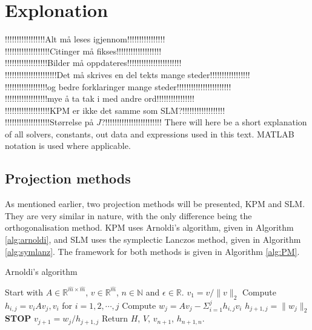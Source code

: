 \chapter{Explonation}
!!!!!!!!!!!!!!!!!Alt må leses igjennom!!!!!!!!!!!!!!!!\\
!!!!!!!!!!!!!!!!!!!Citinger må fikses!!!!!!!!!!!!!!!!!!!\\
!!!!!!!!!!!!!!!!!!Bilder må oppdateres!!!!!!!!!!!!!!!!!!!!!!!\\
!!!!!!!!!!!!!!!!!!!!!!Det må skrives en del tekts mange steder!!!!!!!!!!!!!!!!!\\
!!!!!!!!!!!!!!!!!!og bedre forklaringer mange steder!!!!!!!!!!!!!!!!!!!!!!!\\
!!!!!!!!!!!!!!!!!!mye å ta tak i med andre ord!!!!!!!!!!!!!!!!\\
!!!!!!!!!!!!!!!!!!!KPM er ikke det samme som SLM?!!!!!!!!!!!!!!!!!!\\
!!!!!!!!!!!!!!!!!!!Størrelse på $J$?!!!!!!!!!!!!!!!!!!!!!!!!
There will here be a short explanation of all solvers, constants, out data and expressions used in this text. MATLAB notation is used where applicable.%

\section{Projection methods}
As mentioned earlier, two projection methods will be presented, KPM and SLM. They are very similar in nature, with the only difference being the orthogonalisation method. KPM uses Arnoldi's algorithm, given in Algorithm \ref{alg:arnoldi}, and SLM uses the symplectic Lanczos method, given in Algorithm \ref{alg:symlanz}. The framework for both methods is given in Algorithm \ref{alg:PM}. \\

\begin{algorithm} 
\begin{algorithmic} \caption{Arnoldi's algorithm\cite{arnold}} \label{alg:arnoldi}  
\STATE Start with $A \in \mathbb{R}^{\hat{m} \times \hat{m}}$, $v \in \mathbb{R}^{\hat{m}}$, $n \in \mathbb{N}$ and $\epsilon \in \mathbb{R}$.
\STATE $v_1 = v/\|v \|_2$
   \STATE Compute $h_{i,j} =  v_iAv_j,v_i $ for $i = 1,2,\cdots, j$
    \STATE Compute $w_j = A v_j - \Sigma_{i=1}^{j} h_{i,j}v_i $
    \STATE $h_{j+1,j} = \| w_j \|_2$
        \STATE\textbf{STOP}
    \ENDIF 
   \STATE $v_{j+1} = w_j/h_{j+1,j}$
\ENDFOR
\STATE Return $H$, $V$, $v_{n+1}$, $h_{n+1,n}$.
\end{algorithmic} 
\end{algorithm}

